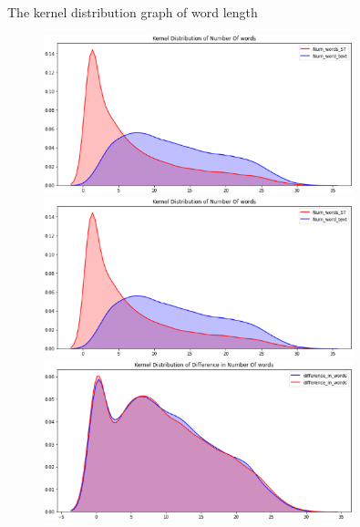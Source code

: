 \documentclass[
 size=14pt,
 paper=smartboard,  %
 mode=present, 		%
 display=slides, 	%
 style=tuliplab,  	%
 pauseslide,
 fleqn,leqno]{powerdot}
\begin{document}
\begin{slide}[toc=,bm=]{The kernel distribution graph of word length}

\begin{figure}[htbp]
  \centering
  \begin{minipage}[t]{0.48\textwidth}
    \centering
    \includegraphics[width=0.8\textwidth]{kaggle/1.1.eps}
    \vspace{0.4em}
    \caption{ }
  \end{minipage}
  \begin{minipage}[t]{0.48\textwidth}
    \centering
    \includegraphics[width=0.8\textwidth]{kaggle/1.2.eps}
    \vspace{0.4em}
    \caption{}
  \end{minipage}
  \begin{minipage}[t]{0.48\textwidth}
    \centering
    \includegraphics[width=0.8\textwidth]{kaggle/1.3.eps}
    \vspace{0.4em}
    \caption{}
  \end{minipage}
\end{figure}


\end{slide}
\end{document}
